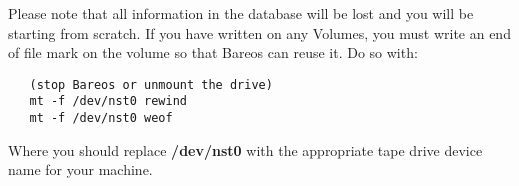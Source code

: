 Please note that all information in the database will be lost and you will be
starting from scratch. If you have written on any Volumes, you must write an
end of file mark on the volume so that Bareos can reuse it. Do so with:

\footnotesize
\begin{verbatim}
   (stop Bareos or unmount the drive)
   mt -f /dev/nst0 rewind
   mt -f /dev/nst0 weof
\end{verbatim}
\normalsize

Where you should replace {\bf /dev/nst0} with the appropriate tape drive
device name for your machine.
